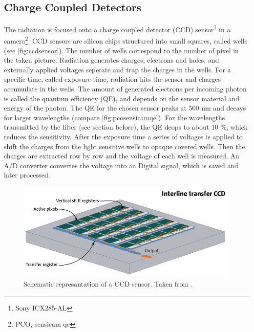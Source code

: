 \subsection{Charge Coupled Detectors}
The radiation is focused onto a charge coupled detector (CCD) sensor\footnote{Sony ICX285-AL} in a camera\footnote{PCO, sensicam qe}. CCD sensors are silicon chips structured into small squares, called wells (see \autoref{fig:ccdsensor}).\cite{SchnellCCD1993} The number of wells correspond to the number of pixel in the taken picture. Radiation generates charges, electrons and holes, and externally applied voltages seperate and trap the charges in the wells. For a specific time, called exposure time, radiation hits the sensor and charges accumulate in the wells. The amount of generated electrons per incoming photon is called the quantum efficiency (QE), and depends on the sensor material and energy of the photon. The QE for the chosen sensor peaks at 500 nm and decays for larger wavelengths (compare \autoref{fig:pcosensicamqe}). For the wavelengths transmitted by the filter (see section before), the QE deops to about 10 \%, which reduces the sensitivity. After the exposure time a series of voltages is applied to shift the charges from the light sensitive wells to opaque covered wells. Then the charges are extracted row by row and the voltage of each well is measured. An A/D converter convertes the voltage into an Digital signal, which is saved and later processed.
\begin{figure}
	\centering
	\includegraphics[width=\linewidth]{Images/ExperimentalSetup/ccd-sensor-interline-transfer-en}
	\caption{Schematic represantation of a CCD sensor. Taken from \cite{StemmerCCD}.}
	\label{fig:ccdsensor}
\end{figure}

